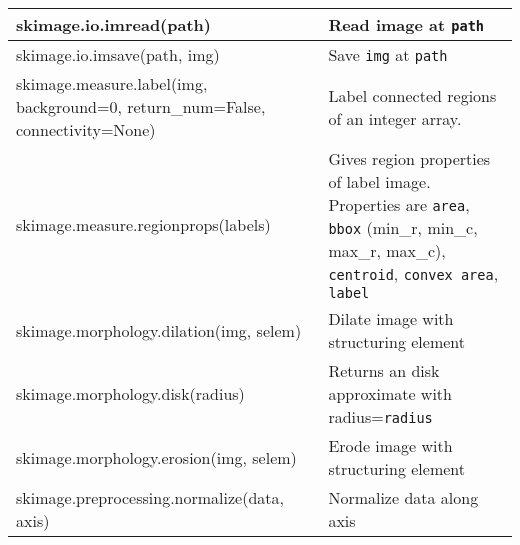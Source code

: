 \begin{tabularx}{\textwidth}{t{8cm} X}
    \hline
    skimage.io.imread(path)                                                        & Read image at \texttt{path}                                                                                                                                                   \\\hline
    skimage.io.imsave(path, img)                                                   & Save \texttt{img} at \texttt{path}                                                                                                                                            \\\hline

    skimage.measure.label(img, background=0, return\_num=False, connectivity=None) & Label connected regions of an integer array.                                                                                                                                  \\\hline
    skimage.measure.regionprops(labels)                                            & Gives region properties of label image. Properties are \texttt{area}, \texttt{bbox} (min\_r, min\_c, max\_r, max\_c), \texttt{centroid}, \texttt{convex area}, \texttt{label} \\\hline

    skimage.morphology.dilation(img, selem)                                        & Dilate image with structuring element                                                                                                                                         \\\hline
    skimage.morphology.disk(radius)                                                & Returns an disk approximate with radius=\texttt{radius}                                                                                                                       \\\hline
    skimage.morphology.erosion(img, selem)                                         & Erode image with structuring element                                                                                                                                          \\\hline

    skimage.preprocessing.normalize(data, axis)                                    & Normalize data along axis                                                                                                                                                     \\\hline


\end{tabularx}
